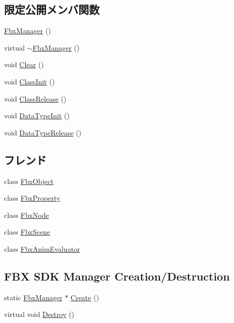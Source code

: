 \subsection*{限定公開メンバ関数}
\begin{DoxyCompactItemize}
\item 
\hyperlink{class_fbx_manager_ab7b188ec0c92172140883e2be38e1a4a}{Fbx\+Manager} ()
\item 
virtual \hyperlink{class_fbx_manager_a37045bda50435f908719b9e45b79ddbd}{$\sim$\+Fbx\+Manager} ()
\item 
void \hyperlink{class_fbx_manager_a110cd4d52da8804bb9f0cda0319790b8}{Clear} ()
\item 
void \hyperlink{class_fbx_manager_a76c35582c17ecbba6745a9a9a7ed8c95}{Class\+Init} ()
\item 
void \hyperlink{class_fbx_manager_a950d348e320856f56dc0166267a4e09f}{Class\+Release} ()
\item 
void \hyperlink{class_fbx_manager_a6d1162c88f894bc99b05e9849c3b9423}{Data\+Type\+Init} ()
\item 
void \hyperlink{class_fbx_manager_a4013385ed5a48933da6ddbdc0078d9cf}{Data\+Type\+Release} ()
\end{DoxyCompactItemize}
\subsection*{フレンド}
\begin{DoxyCompactItemize}
\item 
class \hyperlink{class_fbx_manager_a7ea6fa004b54d9c3cd5b85fd33328078}{Fbx\+Object}
\item 
class \hyperlink{class_fbx_manager_a5d7018830479ec28905f28575480f88f}{Fbx\+Property}
\item 
class \hyperlink{class_fbx_manager_a7b27a89b3d5b45cd1a28960c77e4880b}{Fbx\+Node}
\item 
class \hyperlink{class_fbx_manager_abcc807c3523609e1c734764de626facc}{Fbx\+Scene}
\item 
class \hyperlink{class_fbx_manager_af7d13209ce85d4c6e85c1012ccba1a71}{Fbx\+Anim\+Evaluator}
\end{DoxyCompactItemize}
\subsection*{F\+BX S\+DK Manager Creation/\+Destruction}
\begin{DoxyCompactItemize}
\item 
static \hyperlink{class_fbx_manager}{Fbx\+Manager} $\ast$ \hyperlink{class_fbx_manager_af51cafc0f34f17d497f7921d847a4dd4}{Create} ()
\item 
virtual void \hyperlink{class_fbx_manager_aea778b97b3f0d13578ed0653a9e1212c}{Destroy} ()
\end{DoxyCompactItemize}
